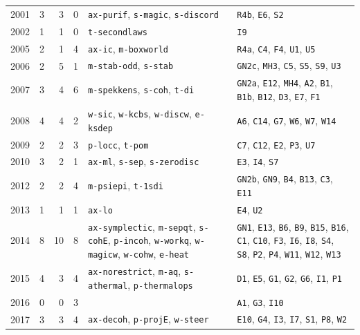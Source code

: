 \begin{longtable}{@{}lrrrp{3.4cm}p{5.6cm}@{}}
2001 & 3 & 3 & 0 & \texttt{ax-purif}, \texttt{s-magic}, \texttt{s-discord} & \texttt{R4b}, \texttt{E6}, \texttt{S2} \\
2002 & 1 & 1 & 0 & \texttt{t-secondlaws} & \texttt{I9} \\
2005 & 2 & 1 & 4 & \texttt{ax-ic}, \texttt{m-boxworld} & \texttt{R4a}, \texttt{C4}, \texttt{F4}, \texttt{U1}, \texttt{U5} \\
2006 & 2 & 5 & 1 & \texttt{m-stab-odd}, \texttt{s-stab} & \texttt{GN2c}, \texttt{MH3}, \texttt{C5}, \texttt{S5}, \texttt{S9}, \texttt{U3} \\
2007 & 3 & 4 & 6 & \texttt{m-spekkens}, \texttt{s-coh}, \texttt{t-di} & \texttt{GN2a}, \texttt{E12}, \texttt{MH4}, \texttt{A2}, \texttt{B1}, \texttt{B1b}, \texttt{B12}, \texttt{D3}, \texttt{E7}, \texttt{F1} \\
2008 & 4 & 4 & 2 & \texttt{w-sic}, \texttt{w-kcbs}, \texttt{w-discw}, \texttt{e-ksdep} & \texttt{A6}, \texttt{C14}, \texttt{G7}, \texttt{W6}, \texttt{W7}, \texttt{W14} \\
2009 & 2 & 2 & 3 & \texttt{p-locc}, \texttt{t-pom} & \texttt{C7}, \texttt{C12}, \texttt{E2}, \texttt{P3}, \texttt{U7} \\
2010 & 3 & 2 & 1 & \texttt{ax-ml}, \texttt{s-sep}, \texttt{s-zerodisc} & \texttt{E3}, \texttt{I4}, \texttt{S7} \\
2012 & 2 & 2 & 4 & \texttt{m-psiepi}, \texttt{t-1sdi} & \texttt{GN2b}, \texttt{GN9}, \texttt{B4}, \texttt{B13}, \texttt{C3}, \texttt{E11} \\
2013 & 1 & 1 & 1 & \texttt{ax-lo} & \texttt{E4}, \texttt{U2} \\
2014 & 8 & 10 & 8 & \texttt{ax-symplectic}, \texttt{m-sepqt}, \texttt{s-cohE}, \texttt{p-incoh}, \texttt{w-workq}, \texttt{w-magicw}, \texttt{w-cohw}, \texttt{e-heat} & \texttt{GN1}, \texttt{E13}, \texttt{B6}, \texttt{B9}, \texttt{B15}, \texttt{B16}, \texttt{C1}, \texttt{C10}, \texttt{F3}, \texttt{I6}, \texttt{I8}, \texttt{S4}, \texttt{S8}, \texttt{P2}, \texttt{P4}, \texttt{W11}, \texttt{W12}, \texttt{W13} \\
2015 & 4 & 3 & 4 & \texttt{ax-norestrict}, \texttt{m-aq}, \texttt{s-athermal}, \texttt{p-thermalops} & \texttt{D1}, \texttt{E5}, \texttt{G1}, \texttt{G2}, \texttt{G6}, \texttt{I1}, \texttt{P1} \\
2016 & 0 & 0 & 3 &  & \texttt{A1}, \texttt{G3}, \texttt{I10} \\
2017 & 3 & 3 & 4 & \texttt{ax-decoh}, \texttt{p-projE}, \texttt{w-steer} & \texttt{E10}, \texttt{G4}, \texttt{I3}, \texttt{I7}, \texttt{S1}, \texttt{P8}, \texttt{W2} \\

\end{longtable}
